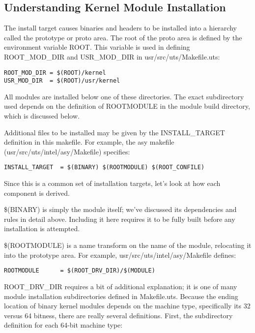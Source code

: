 \documentclass{article}
\begin{document}
\subsection*{Understanding Kernel Module Installation}

The install target causes binaries and headers to be installed into a hierarchy
called the prototype or proto area. The root of the proto area is defined by the
environment variable ROOT. This variable is used in defining ROOT\_MOD\_DIR and
USR\_MOD\_DIR in usr/src/uts/Makefile.uts:

\begin{verbatim}
ROOT_MOD_DIR = $(ROOT)/kernel
USR_MOD_DIR  = $(ROOT)/usr/kernel
\end{verbatim}

All modules are installed below one of these directories. The exact
subdirectory used depends on the definition of ROOTMODULE in the module build
directory, which is discussed below.

Additional files to be installed may be given by the INSTALL\_TARGET definition
in this makefile. For example, the asy makefile \hfill \\
(usr/src/uts/intel/asy/Makefile) specifies:

\begin{verbatim}
INSTALL_TARGET  = $(BINARY) $(ROOTMODULE) $(ROOT_CONFILE)
\end{verbatim}

Since this is a common set of installation targets, let's look at how each
component is derived.

\vspace{0.2cm}
\$(BINARY) is simply the module itself; we've discussed its dependencies and
rules in detail above. Including it here requires it to be fully built before
any installation is attempted.

\vspace{0.2cm}
\$(ROOTMODULE) is a name transform on the name of the module, relocating it into
the prototype area. For example, usr/src/uts/intel/asy/Makefile defines:

\begin{verbatim}
ROOTMODULE      = $(ROOT_DRV_DIR)/$(MODULE)
\end{verbatim}

ROOT\_DRV\_DIR requires a bit of additional explanation; it is one of many module
installation subdirectories defined in Makefile.uts. Because the ending
location of binary kernel modules depends on the machine type, specifically its
32 versus 64 bitness, there are really several definitions. First, the
subdirectory definition for each 64-bit machine type:
\end{document}
